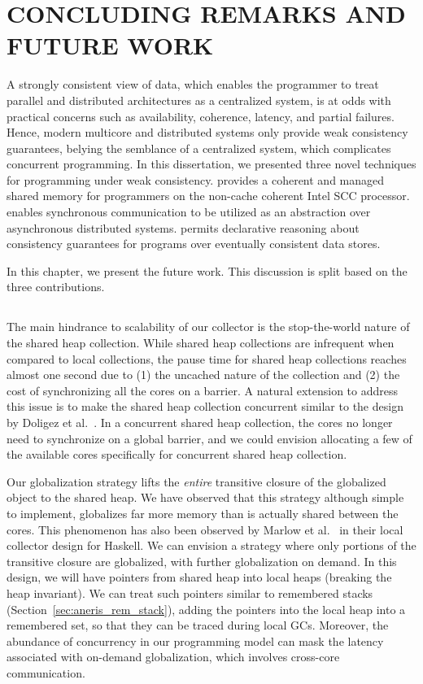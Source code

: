 \chapter{CONCLUDING REMARKS AND FUTURE WORK}
\label{chap:conclusion}

A strongly consistent view of data, which enables the programmer to treat
parallel and distributed architectures as a centralized system, is at odds with
practical concerns such as availability, coherence, latency, and partial
failures. Hence, modern multicore and distributed systems only provide weak
consistency guarantees, belying the semblance of a centralized system, which
complicates concurrent programming. In this dissertation, we presented three
novel techniques for programming under weak consistency. \MMSCC provides a
coherent and managed shared memory for programmers on the non-cache coherent
Intel SCC processor. \rxcml enables synchronous communication to be utilized as
an abstraction over asynchronous distributed systems. \quelea permits
declarative reasoning about consistency guarantees for programs over eventually
consistent data stores.

In this chapter, we present the future work. This discussion is split based on
the three contributions.

\section{\MMSCC}

The main hindrance to scalability of our \MMSCC collector is the stop-the-world
nature of the shared heap collection. While shared heap collections are
infrequent when compared to local collections, the pause time for shared heap
collections reaches almost one second due to (1) the uncached nature of the
collection and (2) the cost of synchronizing all the cores on a barrier. A
natural extension to address this issue is to make the shared heap collection
concurrent similar to the design by Doligez et al.~\cite{Doligez93}. In a
concurrent shared heap collection, the cores no longer need to synchronize on a
global barrier, and we could envision allocating a few of the available cores
specifically for concurrent shared heap collection.

Our globalization strategy lifts the \emph{entire} transitive closure of the
globalized object to the shared heap. We have observed that this strategy
although simple to implement, globalizes far more memory than is actually
shared between the cores. This phenomenon has also been observed by Marlow et
al.~\cite{Marlow11} in their local collector design for Haskell. We can
envision a strategy where only portions of the transitive closure are
globalized, with further globalization on demand. In this design, we will have
pointers from shared heap into local heaps (breaking the heap invariant). We
can treat such pointers similar to remembered
stacks (Section~\ref{sec:aneris_rem_stack}), adding the pointers into the local heap
into a remembered set, so that they can be traced during local GCs. Moreover,
the abundance of concurrency in our programming model can mask the latency
associated with on-demand globalization, which involves cross-core
communication.

